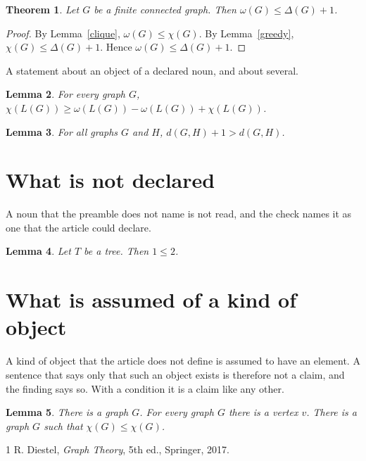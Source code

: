 \documentclass{article}
\newtheorem{theorem}{Theorem}
\newtheorem{lemma}[theorem]{Lemma}
\begin{document}
\begin{theorem}\label{main}
Let $G$ be a finite connected graph. Then $\omega(G)\le\Delta(G)+1$.
\end{theorem}
\begin{proof}
By Lemma~\ref{clique}, $\omega(G)\le\chi(G)$. By Lemma~\ref{greedy}, $\chi(G)\le\Delta(G)+1$.
Hence $\omega(G)\le\Delta(G)+1$.
\end{proof}

A statement about an object of a declared noun, and about several.

\begin{lemma}\label{line}
For every graph $G$, $\chi(L(G))\ge\omega(L(G))-\omega(L(G))+\chi(L(G))$.
\end{lemma}

\begin{lemma}\label{distance}
For all graphs $G$ and $H$, $d(G,H)+1>d(G,H)$.
\end{lemma}

\section{What is not declared}

A noun that the preamble does not name is not read, and the check names it as one that
the article could declare.

\begin{lemma}\label{undeclared}
Let $T$ be a tree. Then $1\le2$.
\end{lemma}

\section{What is assumed of a kind of object}

A kind of object that the article does not define is assumed to have an element. A
sentence that says only that such an object exists is therefore not a claim, and the
finding says so. With a condition it is a claim like any other.

\begin{lemma}\label{exists}
There is a graph $G$. For every graph $G$ there is a vertex $v$.
There is a graph $G$ such that $\chi(G)\le\chi(G)$.
\end{lemma}

\begin{thebibliography}{1}
 R. Diestel, \emph{Graph Theory}, 5th ed., Springer, 2017.
\end{thebibliography}
\end{document}
